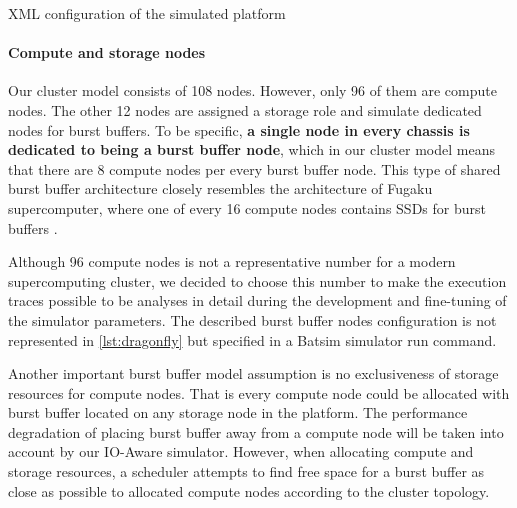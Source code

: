 \documentclass[thesis-en.tex]{subfiles}
\begin{document}
    
%     

\begin{listing}
    \inputminted[linenos,frame=lines,style=borland]{xml}{code/dragonfly96-thesis.xml}
    \caption{XML configuration of the simulated platform}
    \label{lst:dragonfly}
\end{listing}

\paragraph{Compute and storage nodes} \label{sec:nodes}
Our cluster model consists of 108 nodes. However, only 96 of them are compute nodes. The other 12 nodes are assigned a storage role and simulate dedicated nodes for burst buffers. To be specific, \textbf{a single node in every chassis is dedicated to being a burst buffer node}, which in our cluster model means that there are 8 compute nodes per every burst buffer node. This type of shared burst buffer architecture closely resembles the architecture of Fugaku supercomputer, where one of every 16 compute nodes contains SSDs for burst buffers \cite{fugaku}.

Although 96 compute nodes is not a representative number for a modern supercomputing cluster, we decided to choose this number to make the execution traces possible to be analyses in detail during the development and fine-tuning of the simulator parameters. The described burst buffer nodes configuration is not represented in \autoref{lst:dragonfly} but specified in a Batsim simulator run command.

Another important burst buffer model assumption is no exclusiveness of storage resources for compute nodes. That is every compute node could be allocated with burst buffer located on any storage node in the platform. The performance degradation of placing burst buffer away from a compute node will be taken into account by our IO-Aware simulator. However, when allocating compute and storage resources, a scheduler attempts to find free space for a burst buffer as close as possible to allocated compute nodes according to the cluster topology.
\end{document}
